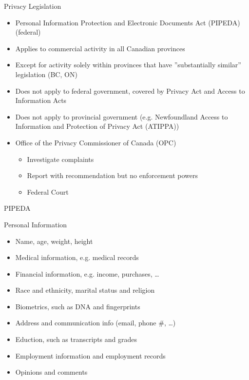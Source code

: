 \documentclass[ignorenonframetext,xcolor=x11names]{beamer}
\begin{document}
\begin{frame}{Privacy Legislation}
  \begin{itemize}
     \item Personal Information Protection and Electronic Documents Act (PIPEDA) (federal)
     \item Applies to commercial activity in all Canadian provinces
     \item Except for activity solely within provinces that have ''substantially similar'' legislation (BC, ON)
     \item Does not apply to federal government, covered by Privacy Act and Access to Information Acts
     \item Does not apply to provincial government (e.g. Newfoundland Access to Information and Protection of Privacy Act (ATIPPA))
  \end{itemize}
\begin{itemize}
   \item Office of the Privacy Commissioner of Canada (OPC)
   \begin{itemize}
      \item Investigate complaints
      \item Report with recommendation but no enforcement powers
      \item Federal Court
   \end{itemize}
\end{itemize}
\end{frame}

\begin{frame}{PIPEDA}
  \begin{block}{Personal Information}
    \begin{itemize}
       \item Name, age, weight, height
       \item Medical information, e.g. medical records
       \item Financial information, e.g. income, purchases, \ldots
       \item Race and ethnicity, marital status and religion
       \item Biometrics, such as DNA and fingerprints
       \item Address and communication info (email, phone \#, \ldots)
       \item Eduction, such as transcripts and grades
       \item Employment information and employment records
       \item Opinions and comments
    \end{itemize} 
  \end{block}
\end{frame}
\end{document}

